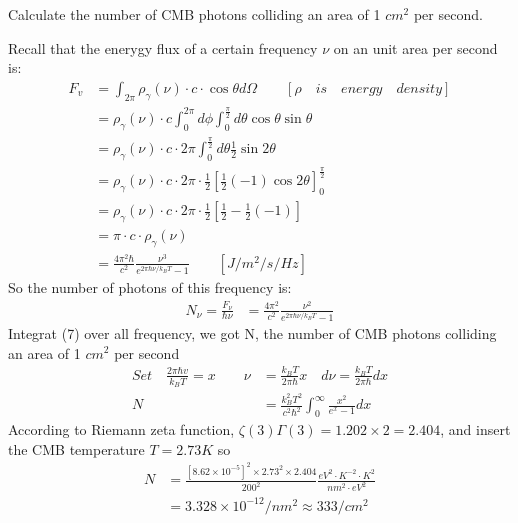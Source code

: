 \documentclass[answers]{exam}
\begin{document}
\begin{questions}
\question  Calculate the number of CMB photons colliding an area of 1 $cm^{2}$ per second.
\begin{solution}
Recall that the enerygy flux of a certain frequency $\nu$ on an unit area per second is:
\begin{align*}
F_{v} &=\int_{2 \pi} \rho_{\gamma}(\nu ) \cdot c \cdot \cos \theta d \Omega\qquad [\rho\quad is\quad energy\quad density] \\
&=\rho_{\gamma}(\nu ) \cdot c \int_{0}^{2 \pi} d \phi \int_{0}^{\frac{\pi}{2}} d \theta \cos \theta \sin \theta \\
&=\rho_{\gamma}(\nu) \cdot c \cdot 2 \pi \int_{0}^{\frac{\pi}{2}} d \theta \frac{1}{2} \sin 2 \theta \\
&=\rho_{\gamma}(\nu ) \cdot c \cdot 2 \pi\cdot  \frac{1}{2}\left[\frac{1}{2}(-1) \cos 2 \theta\right]_{0}^{\frac{\pi}{2}} \\
&=\rho _{\gamma}(\nu) \cdot c \cdot 2 \pi \cdot \frac{1}{2}\left[\frac{1}{2}-\frac{1}{2}(-1)\right]\\
&=\pi \cdot c \cdot \rho_{\gamma}(\nu) \\ 
&=\frac{4 \pi^{2} \hbar}{c^{2}} \frac{\nu ^{3}}{e^{2 \pi \hbar\nu  / k_{B} T}-1}\qquad \left[J / m^{2} / s / H z\right]    
\end{align*}    
So the number of photons of this frequency is:
\begin{align}
N_{\nu}=\frac{F_{\nu}}{\hbar\nu}&=\frac{4 \pi^{2}}{c^{2}} \frac{\nu ^{2}}{e^{2 \pi \hbar\nu/ k_{B} T}-1}
\end{align} 
Integrat (7) over all frequency, we got N, the number of CMB photons colliding an area of 1 $cm^{2}$ per second
\begin{align*}
Set\quad \frac{2 \pi \hbar v}{k_{B} T}=x \quad  \quad \nu &=\frac{k_{B} T}{2 \pi \hbar} x \quad d \nu =\frac{k_{B} T}{2 \pi \hbar} d x\\
N&=\frac{k_{B}^{2}T^{2} }{c^2\hbar ^2} \int _{0} ^{\infty}\frac{x^{2}}{e^{x}-1} d x
\end{align*}
According to Riemann zeta function, $\zeta(3) \Gamma(3)=1.202\times 2=2.404$, and insert the CMB temperature $T=2.73K$ so
\begin{align*}
N&=\frac{[8.62\times 10^{-5}]^2\times 2.73^2\times 2.404}{200^2} \frac{eV^2\cdot K^{-2}\cdot K^{2}}{nm^2\cdot eV^2}\\ 
&=3.328\times10^{-12}/nm^{2}\approx333/cm^{2}
\end{align*}
\end{solution}


\end{questions}
\end{document}
